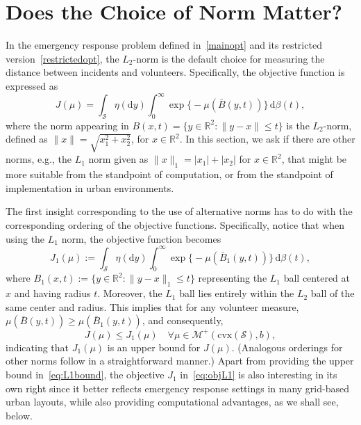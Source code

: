 \documentclass[stsy,sglanonrev]{informs4}
\newcommand{\death}{{\beta}}
\begin{document}
\section{Does the Choice of Norm Matter?}\label{sec:normMatter}
In the emergency response problem defined in~\eqref{mainopt} and its restricted version~\eqref{restrictedopt}, the \(L_2\)-norm is the default choice for measuring the distance between incidents and volunteers. Specifically, the objective function is expressed as  
\begin{equation*}
    J(\mu) = \int_{\mathcal{S}} \eta(\mathrm{d}y) \int_0^\infty \exp\Big\{-\mu(\bar{B}(y,t))\Big\} \, \mathrm{d}\death(t),
\end{equation*}  
where the norm appearing in \(B(x, t) = \{y \in \mathbb{R}^2: \|y-x\| \leq t\}\) is the \(L_2\)-norm, defined as \(\|x\| = \sqrt{x_1^2 + x_2^2}\), for $x \in \mathbb{R}^2$. In this section, we ask if there are other norms, e.g., the $L_1$ norm given as \(\|x\|_1 = |x_1| + |x_2|\) for \(x \in \mathbb{R}^2\), that might be more suitable from the standpoint of computation, or from the standpoint of implementation in urban environments. 

The first insight corresponding to the use of alternative norms has to do with the corresponding ordering of the objective functions. Specifically, notice that when using the $L_1$ norm, the objective function becomes
\begin{equation}\label{eq:objL1}
    J_1(\mu) := \int_{\mathcal{S}} \eta(\mathrm{d}y) \int_0^\infty \exp\Big\{-\mu(\bar{B}_1(y,t))\Big\} \, \mathrm{d}\death(t),
\end{equation} 
where \(B_1(x, t) := \{y \in \mathbb{R}^2: \|y-x\|_1 \leq t\}\) representing the $L_1$ ball centered at \(x\) and having radius \(t\). Moreover, the $L_1$ ball lies entirely within the $L_2$ ball of the same center and radius. This implies that for any volunteer measure, \(\mu(\bar{B}(y,t)) \geq \mu(\bar{B}_1(y,t))\), and  consequently,
\begin{equation}\label{eq:L1bound}
    J(\mu) \leq J_1(\mu) \quad \forall \mu \in \mathcal{M}^+(\mathrm{cvx}(\mathcal{S}), b),
\end{equation}
indicating that \(J_1(\mu)\) is an upper bound for \(J(\mu)\). (Analogous orderings for other norms follow in a straightforward manner.) Apart from providing the upper bound in~\eqref{eq:L1bound}, the objective $J_1$ in~\eqref{eq:objL1} is also interesting in its own right since it better reflects emergency response settings in many grid-based urban layouts, while also providing computational advantages, as we shall see, below.  
\end{document}
